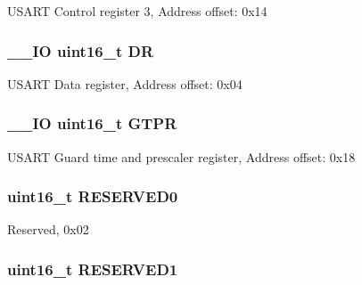 U\-S\-A\-R\-T Control register 3, Address offset\-: 0x14 \hypertarget{struct_u_s_a_r_t___type_def_a0a1acc0425516ff7969709d118b96a3b}{
\subsubsection[{D\-R}]{\setlength{\rightskip}{0pt plus 5cm}\-\_\-\-\_\-\-I\-O uint16\-\_\-t D\-R}}\label{struct_u_s_a_r_t___type_def_a0a1acc0425516ff7969709d118b96a3b}
U\-S\-A\-R\-T Data register, Address offset\-: 0x04 \hypertarget{struct_u_s_a_r_t___type_def_a26f8b74978e03c8a4c99c9395a6a524d}{
\subsubsection[{G\-T\-P\-R}]{\setlength{\rightskip}{0pt plus 5cm}\-\_\-\-\_\-\-I\-O uint16\-\_\-t G\-T\-P\-R}}\label{struct_u_s_a_r_t___type_def_a26f8b74978e03c8a4c99c9395a6a524d}
U\-S\-A\-R\-T Guard time and prescaler register, Address offset\-: 0x18 \hypertarget{struct_u_s_a_r_t___type_def_a149feba01f9c4a49570c6d88619f504f}{
\subsubsection[{R\-E\-S\-E\-R\-V\-E\-D0}]{\setlength{\rightskip}{0pt plus 5cm}uint16\-\_\-t R\-E\-S\-E\-R\-V\-E\-D0}}\label{struct_u_s_a_r_t___type_def_a149feba01f9c4a49570c6d88619f504f}
Reserved, 0x02 \hypertarget{struct_u_s_a_r_t___type_def_a8249a3955aace28d92109b391311eb30}{
\subsubsection[{R\-E\-S\-E\-R\-V\-E\-D1}]{\setlength{\rightskip}{0pt plus 5cm}uint16\-\_\-t R\-E\-S\-E\-R\-V\-E\-D1}}\label{struct_u_s_a_r_t___type_def_a8249a3955aace28d92109b391311eb30}
